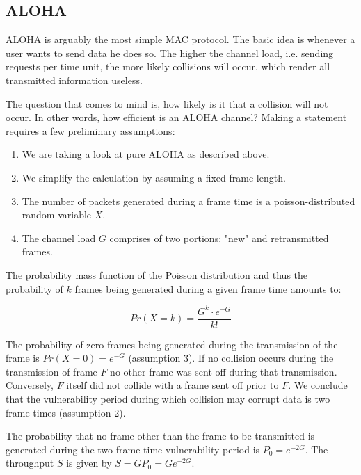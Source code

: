 \subsection{ALOHA}

ALOHA is arguably the most simple MAC protocol. The basic idea is whenever a user wants to send data he does so. The higher the channel load, i.e. sending requests per time unit, the more likely collisions will occur, which render all transmitted information useless.

\bigskip

The question that comes to mind is, how likely is it that a collision will not occur. In other words, how efficient is an ALOHA channel? Making a statement requires a few preliminary assumptions:

\smallskip

\begin{enumerate}
	\item We are taking a look at pure ALOHA as described above.
	\item We simplify the calculation by assuming a fixed frame length.
	\item The number of packets generated during a frame time is a poisson-distributed random variable $X$.
	\item The channel load $G$ comprises of two portions: "new" and retransmitted frames.
\end{enumerate}

\bigskip

The probability mass function of the Poisson distribution and thus the probability of $k$ frames being generated during a given frame time amounts to:

\begin{equation}
	Pr(X=k) = \frac{G^k\cdot e^{-G}}{k!}
\end{equation}

The probability of zero frames being generated during the transmission of the frame is $Pr(X=0) = e^{-G}$ (assumption 3). If no collision occurs during the transmission of frame $F$ no other frame was sent off during that transmission. Conversely, $F$ itself did not collide with a frame sent off prior to $F$. We conclude that the vulnerability period during which collision may corrupt data is two frame times (assumption 2).

\bigskip

The probability that no frame other than the frame to be transmitted is generated during the two frame time vulnerability period is $P_0 = e^{-2G}$. The throughput $S$ is given by $S=GP_0 = Ge^{-2G}$.

